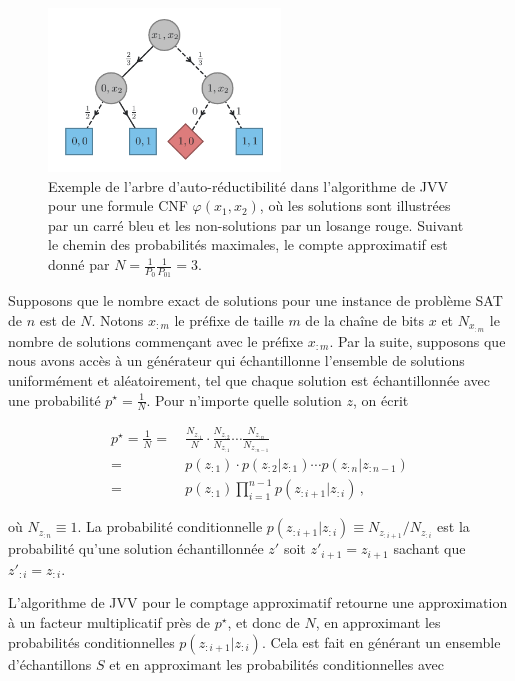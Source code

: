 \begin{figure}[h!]
    \centering
    \includegraphics[width=0.55\textwidth]{figures/jvv-algorithm.pdf}
    \caption[Algorithme de Jerrum-Valiant-Vazirani]{Exemple de l'arbre d'auto-réductibilité dans l'algorithme de JVV pour une formule CNF $\varphi(x_{1}, x_{2})$, où les solutions sont illustrées par un carré bleu et les non-solutions par un losange rouge. Suivant le chemin des probabilités maximales, le compte approximatif est donné par $N = \frac{1}{P_{0}} \frac{1}{P_{01}} = 3$.}
    \label{fig:algorithme-jvv}
\end{figure}

Supposons que le nombre exact de solutions pour une instance de problème SAT de $n$ est de $N$. Notons $x_{:m}$ le préfixe de taille $m$ de la chaîne de bits $x$ et $N_{x_{:m}}$ le nombre de solutions commençant avec le préfixe $x_{:m}$. Par la suite, supposons que nous avons accès à un générateur qui échantillonne l'ensemble de solutions uniformément et aléatoirement, tel que chaque solution est échantillonnée avec une probabilité $p^{\star} = \frac{1}{N}$. Pour n'importe quelle solution $z$, on écrit

\begin{align}
    p^\star = \frac1N =&{\ } \frac{N_{z_{:1}}}{N} \cdot \frac{N_{z_{:2}}}{N_{z_{:1}}} \cdots \frac{N_{z_{:n}}}{N_{z_{:n-1}}} \\
    =&{\ } p(z_{:1}) \cdot p(z_{:2}|z_{:1}) \cdots p(z_{:n}|z_{:n-1}) \\
    =&{\ } p(z_{:1}) \prod_{i=1}^{n-1} p(z_{:i+1}|z_{:i}) \,,
\end{align}

où $N_{z_{:n}} \equiv 1$. La probabilité conditionnelle $p(z_{:i+1}|z_{:i}) \equiv N_{z_{:i+1}} / N_{z_{:i}}$ est la probabilité qu'une solution échantillonnée $z'$ soit $z'_{i+1} = z_{i+1}$ sachant que $z'_{:i} = z_{:i}$.  

L'algorithme de JVV pour le comptage approximatif retourne une approximation à un facteur multiplicatif près de $p^{\star}$, et donc de $N$, en approximant les probabilités conditionnelles $p(z_{:i+1}|z_{:i})$. Cela est fait en générant un ensemble d'échantillons $S$ et en approximant les probabilités conditionnelles avec

